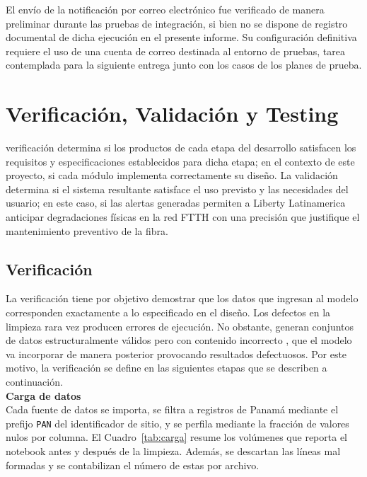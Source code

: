 \documentclass[12pt,a4paper]{article}
\begin{document}
El envío de la notificación por correo electrónico fue verificado de manera preliminar durante las pruebas de integración, si bien no se dispone de registro documental de dicha ejecución en el presente informe. Su configuración
definitiva requiere el uso de una cuenta de correo destinada al entorno de pruebas, tarea contemplada para la siguiente entrega junto con los casos de los planes de prueba.



\section{Verificación, Validación y Testing}
\label{sec:vvt}
\noindent
verificación determina si los productos de cada etapa del desarrollo satisfacen los requisitos y 
 especificaciones establecidos para dicha etapa; en el contexto de este proyecto, si cada módulo implementa
  correctamente su diseño. La validación determina si el sistema resultante satisface el uso previsto 
  y las necesidades del usuario; en este caso, si las alertas generadas permiten a Liberty Latinamerica anticipar
   degradaciones físicas en la red FTTH con una precisión que justifique el mantenimiento preventivo de la fibra.\\

\subsection{Verificación}
\label{subsec:verificacion}

\noindent
La verificación tiene por objetivo demostrar que los datos que ingresan al modelo corresponden exactamente
 a lo especificado en el diseño. Los defectos en la limpieza rara vez producen
  errores de ejecución. No obstante, generan conjuntos de datos estructuralmente válidos pero con contenido incorrecto
  , que el modelo va incorporar de manera posterior provocando resultados defectuosos. Por este motivo, la verificación se define en
   las siguientes etapas que se describen a
    continuación.\\
    \newline
\noindent
\textbf{Carga de datos } 
\\
Cada fuente de datos se importa, se filtra a registros de Panamá mediante el prefijo \texttt{PAN} del identificador de sitio, y se perfila mediante 
la fracción de valores nulos por columna. El Cuadro~\ref{tab:carga} resume los volúmenes que reporta el notebook antes
y después de la limpieza. Además, se descartan las líneas mal formadas y se contabilizan el número de estas por archivo.
\end{document}
